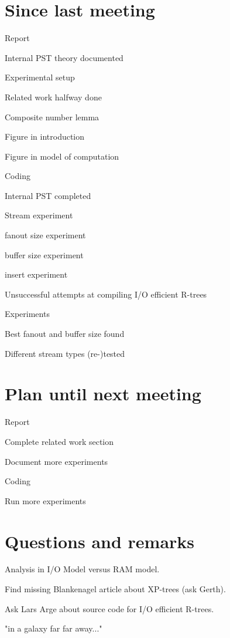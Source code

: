 \documentclass[a4paper,11pt,agenda,chair]{meetingmins}
\begin{document}
\maketitle

\section{Since last meeting}
\begin{items}
\item Report
	\begin{items}
		\item Internal PST theory documented
		\item Experimental setup
		\item Related work halfway done
		\item Composite number lemma
		\item Figure in introduction
		\item Figure in model of computation
	\end{items}
\item Coding
	\begin{items}
		\item Internal PST completed
		\item Stream experiment
		\item fanout size experiment
		\item buffer size experiment
		\item insert experiment
		\item Unsuccessful attempts at compiling I/O efficient R-trees
	\end{items}
\item Experiments
	\begin{items}
		\item Best fanout and buffer size found
		\item Different stream types (re-)tested
	\end{items}
\end{items}

\section{Plan until next meeting}
\begin{items}
\item Report
	\begin{items}
		\item Complete related work section
		\item Document more experiments
	\end{items}
\item Coding
	\begin{items}
		\item Run more experiments
	\end{items}
\end{items}

\section{Questions and remarks}
\begin{items}
	\item Analysis in I/O Model versus RAM model.
	\item Find missing Blankenagel article about XP-trees (ask Gerth).
	\item Ask Lars Arge about source code for I/O efficient R-trees.
	\item "in a galaxy far far away..."
\end{items}
\end{document}
